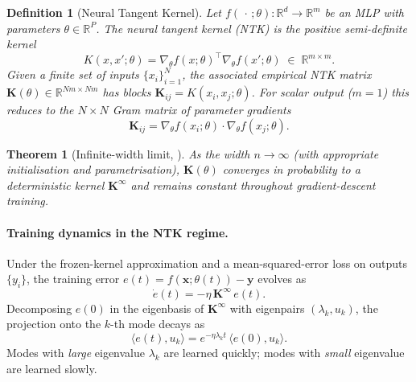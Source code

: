 \documentclass{article}
\newtheorem{definition}{Definition}
\newtheorem{theorem}{Theorem}
\begin{document}
\begin{definition}[Neural Tangent Kernel]
    Let $f(\,\cdot\,;\theta):\mathbb{R}^{d}\to\mathbb{R}^{m}$ be an MLP with
    parameters $\theta\in\mathbb{R}^{P}$.  The \emph{neural tangent kernel}
    (NTK) is the positive semi-definite kernel
    \begin{equation}
        K(x,x';\theta)
        = \nabla_{\theta}f(x;\theta)^{\top}\nabla_{\theta}f(x';\theta)
        \;\in\;\mathbb{R}^{m\times m}.
    \end{equation}
    Given a finite set of inputs $\{x_i\}_{i=1}^{N}$, the associated
    \emph{empirical NTK matrix} $\mathbf{K}(\theta)\in\mathbb{R}^{Nm\times Nm}$
    has blocks $\mathbf{K}_{ij}=K(x_i,x_j;\theta)$.
    For scalar output ($m=1$) this reduces to the $N\times N$ Gram matrix of
    parameter gradients
    \begin{equation}
        \mathbf{K}_{ij}
        = \nabla_{\theta}f(x_i;\theta)\cdot\nabla_{\theta}f(x_j;\theta).
    \end{equation}
\end{definition}

\begin{theorem}[Infinite-width limit, \cite{jacot2018}]
    As the width $n\to\infty$ (with appropriate initialisation and
    parametrisation), $\mathbf{K}(\theta)$ converges in probability to a
    deterministic kernel $\mathbf{K}^{\infty}$ and remains \emph{constant}
    throughout gradient-descent training.
\end{theorem}

\paragraph{Training dynamics in the NTK regime.}
Under the frozen-kernel approximation and a mean-squared-error loss on outputs
$\{y_i\}$, the training error $e(t)=f(\mathbf{x};\theta(t))-\mathbf{y}$
evolves as
\begin{equation}
    \dot{e}(t) = -\eta\,\mathbf{K}^{\infty}\,e(t).
\end{equation}
Decomposing $e(0)$ in the eigenbasis of $\mathbf{K}^{\infty}$ with eigenpairs
$(\lambda_k,u_k)$, the projection onto the $k$-th mode decays as
\begin{equation}
    \langle e(t), u_k\rangle = e^{-\eta\lambda_k t}\,\langle e(0),u_k\rangle.
\end{equation}
Modes with \emph{large} eigenvalue $\lambda_k$ are learned quickly; modes with
\emph{small} eigenvalue are learned slowly.
\end{document}
